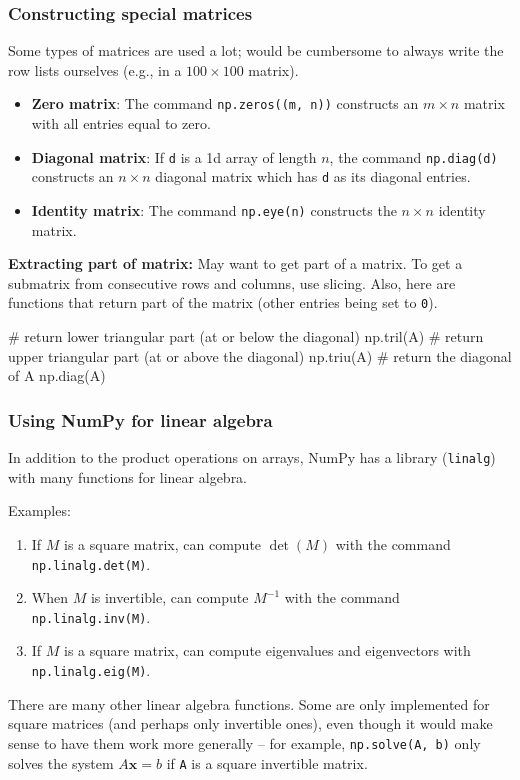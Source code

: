 \documentclass{beamer}
\newenvironment{codeblock}
    {\hfill\begin{beamerboxesrounded}[lower=codecol, width=0.8\textwidth]
    \medskip

    }
    { 
    \end{beamerboxesrounded}\hfill
    }
\theoremstyle{example}
\newcommand{\ttt}[1]{{\small\texttt{#1}}}
\begin{document}
\begin{frame}[fragile]
\frametitle{Constructing special matrices}
Some types of matrices are used a lot; would be cumbersome to always write the row lists ourselves (e.g., in a $100\times100$ matrix).
    
    \begin{itemize}
        \item[] \textbf{Zero matrix}: The command \ttt{np.zeros((m, n))} constructs an $m\times n$ matrix with all entries equal to zero.
        \item[] \textbf{Diagonal matrix}: If \ttt{d} is a 1d array of length $n$, the command \ttt{np.diag(d)} constructs an $n\times n$ diagonal matrix which has \ttt{d} as its diagonal entries.
        \item[] \textbf{Identity matrix}: The command \ttt{np.eye(n)} constructs the $n\times n$ identity matrix.
    \end{itemize}
    
\textbf{Extracting part of matrix:} May want to get part of a matrix. To get a submatrix from consecutive rows and columns, use slicing. %
Also, here are functions that return part of the matrix (other entries being set to \ttt{0}).%

\begin{codeblock}

\begin{python}
# return lower triangular part (at or below the diagonal)
np.tril(A)
# return upper triangular part (at or above the diagonal)
np.triu(A)
# return the diagonal of A
np.diag(A)
\end{python}

\end{codeblock}
\end{frame}

\begin{frame}
\frametitle{Using NumPy for linear algebra}
In addition to the product operations on arrays, NumPy has a library (\ttt{linalg}) with many functions for linear algebra. 

Examples: 
\begin{enumerate}
    \item If $M$ is a square matrix, can compute $\det(M)$ with the command \ttt{np.linalg.det(M)}.
    \item When $M$ is invertible, can compute $M^{-1}$ with the command \ttt{np.linalg.inv(M)}.
    \item If $M$ is a square matrix, can compute eigenvalues and eigenvectors with \ttt{np.linalg.eig(M)}. 
\end{enumerate}

There are many other linear algebra functions. Some are only implemented for square matrices (and perhaps only invertible ones), even though it would make sense to have them work more generally {--} for example, \ttt{np.solve(A, b)} only solves the system $A\mathbf{x} = b$ if \ttt{A} is a square invertible matrix.
\end{frame}
\end{document}
